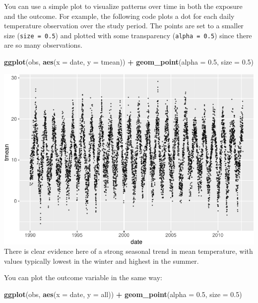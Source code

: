 \documentclass[
]{book}
\newenvironment{Shaded}{\begin{snugshade}}{\end{snugshade}}
\newcommand{\DataTypeTok}[1]{\textcolor[rgb]{0.13,0.29,0.53}{#1}}
\newcommand{\FloatTok}[1]{\textcolor[rgb]{0.00,0.00,0.81}{#1}}
\newcommand{\KeywordTok}[1]{\textcolor[rgb]{0.13,0.29,0.53}{\textbf{#1}}}
\newcommand{\NormalTok}[1]{#1}
\newcommand{\OperatorTok}[1]{\textcolor[rgb]{0.81,0.36,0.00}{\textbf{#1}}}
\newcommand{\StringTok}[1]{\textcolor[rgb]{0.31,0.60,0.02}{#1}}
\begin{document}
You can use a simple plot to visualize patterns over time in both the exposure
and the outcome. For example, the following code plots a dot for each daily
temperature observation over the study period. The points are set to a smaller
size (\texttt{size\ =\ 0.5}) and plotted with some transparency (\texttt{alpha\ =\ 0.5}) since
there are so many observations.

\begin{Shaded}
\begin{Highlighting}[]
\KeywordTok{ggplot}\NormalTok{(obs, }\KeywordTok{aes}\NormalTok{(}\DataTypeTok{x =}\NormalTok{ date, }\DataTypeTok{y =}\NormalTok{ tmean)) }\OperatorTok{+}\StringTok{ }
\StringTok{  }\KeywordTok{geom_point}\NormalTok{(}\DataTypeTok{alpha =} \FloatTok{0.5}\NormalTok{, }\DataTypeTok{size =} \FloatTok{0.5}\NormalTok{)}
\end{Highlighting}
\end{Shaded}

\includegraphics{adv_epi_analysis_files/figure-latex/unnamed-chunk-8-1.pdf}
There is clear evidence here of a strong seasonal trend in mean temperature,
with values typically lowest in the winter and highest in the summer.

You can plot the outcome variable in the same way:

\begin{Shaded}
\begin{Highlighting}[]
\KeywordTok{ggplot}\NormalTok{(obs, }\KeywordTok{aes}\NormalTok{(}\DataTypeTok{x =}\NormalTok{ date, }\DataTypeTok{y =}\NormalTok{ all)) }\OperatorTok{+}\StringTok{ }
\StringTok{  }\KeywordTok{geom_point}\NormalTok{(}\DataTypeTok{alpha =} \FloatTok{0.5}\NormalTok{, }\DataTypeTok{size =} \FloatTok{0.5}\NormalTok{)}
\end{Highlighting}
\end{Shaded}
\end{document}
